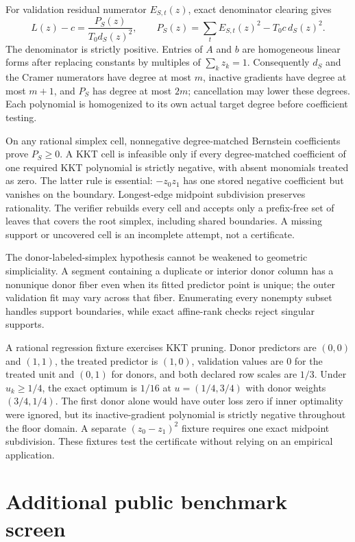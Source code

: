 \documentclass[10pt]{article}
\theoremstyle{definition}
\begin{document}
For validation residual numerator $E_{S,t}(z)$, exact denominator clearing gives
\[
 L(z)-c=
 \frac{P_S(z)}{T_0d_S(z)^2},\qquad
 P_S(z)=\sum_tE_{S,t}(z)^2-T_0c\,d_S(z)^2.
\]
The denominator is strictly positive.  Entries of $A$ and $b$ are homogeneous
linear forms after replacing constants by multiples of $\sum_kz_k=1$.
Consequently $d_S$ and the Cramer numerators have degree at most $m$, inactive
gradients have degree at most $m+1$, and $P_S$ has degree at most $2m$;
cancellation may lower these degrees.  Each polynomial is homogenized to its
own actual target degree before coefficient testing.

On any rational simplex cell, nonnegative degree-matched Bernstein
coefficients prove $P_S\ge0$.  A KKT cell is infeasible only if every
degree-matched coefficient of one required KKT polynomial is strictly negative,
with absent monomials treated as zero.  The latter rule is essential:
$-z_0z_1$ has one stored negative coefficient but vanishes on the boundary.
Longest-edge midpoint subdivision preserves rationality.  The verifier rebuilds
every cell and accepts only a prefix-free set of leaves that covers the root
simplex, including shared boundaries.  A missing support or uncovered cell is
an incomplete attempt, not a certificate.

The donor-labeled-simplex hypothesis cannot be weakened to geometric
simpliciality.  A segment containing a duplicate or interior donor column has
a nonunique donor fiber even when its fitted predictor point is unique; the
outer validation fit may vary across that fiber.  Enumerating every nonempty
subset handles support boundaries, while exact affine-rank checks reject
singular supports.

A rational regression fixture exercises KKT pruning.  Donor predictors are
$(0,0)$ and $(1,1)$, the treated predictor is $(1,0)$, validation values are
$0$ for the treated unit and $(0,1)$ for donors, and both declared row scales
are $1/3$.  Under $u_k\ge1/4$, the exact optimum is $1/16$ at
$u=(1/4,3/4)$ with donor weights $(3/4,1/4)$.  The first donor alone would have
outer loss zero if inner optimality were ignored, but its inactive-gradient
polynomial is strictly negative throughout the floor domain.  A separate
$(z_0-z_1)^2$ fixture requires one exact midpoint subdivision.  These fixtures
test the certificate without relying on an empirical application.

\section{Additional public benchmark screen}\label{app:public-screen}
\end{document}
